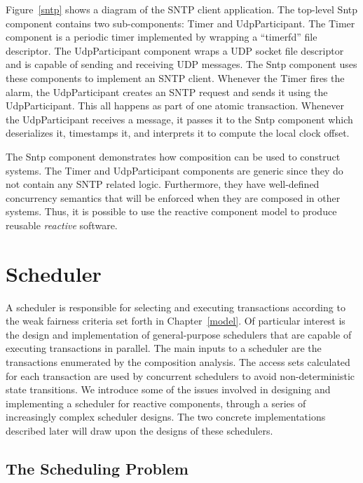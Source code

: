 Figure~\ref{sntp} shows a diagram of the SNTP client application.
The top-level Sntp component contains two sub-components:  Timer and UdpParticipant.
The Timer component is a periodic timer implemented by wrapping a ``timerfd'' file descriptor.
The UdpParticipant component wraps a UDP socket file descriptor and is capable of sending and receiving UDP messages.
The Sntp component uses these components to implement an SNTP client.
Whenever the Timer fires the alarm, the UdpParticipant creates an SNTP request and sends it using the UdpParticipant.
This all happens as part of one atomic transaction.
Whenever the UdpParticipant receives a message, it passes it to the Sntp component which deserializes it, timestamps it, and interprets it to compute the local clock offset.

The Sntp component demonstrates how composition can be used to construct systems.
The Timer and UdpParticipant components are generic since they do not contain any SNTP related logic.
Furthermore, they have well-defined concurrency semantics that will be enforced when they are composed in other systems.
Thus, it is possible to use the reactive component model to produce reusable \emph{reactive} software.

\section{Scheduler}

A scheduler is responsible for selecting and executing transactions according to the weak fairness criteria set forth in Chapter~\ref{model}.
Of particular interest is the design and implementation of general-purpose schedulers that are capable of executing transactions in parallel.
The main inputs to a scheduler are the transactions enumerated by the composition analysis.
The access sets calculated for each transaction are used by concurrent schedulers to avoid non-deterministic state transitions.
We introduce some of the issues involved in designing and implementing a scheduler for reactive components, through a series of increasingly complex scheduler designs.
The two concrete implementations described later will draw upon the designs of these schedulers.

\subsection{The Scheduling Problem}
\label{scheduling_problem}

